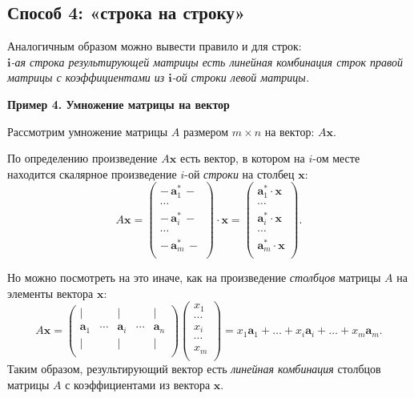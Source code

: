 \documentclass[11pt,a4paper]{article}
\begin{document}
    \hypertarget{ux441ux43fux43eux441ux43eux431-4-ux441ux442ux440ux43eux43aux430-ux43dux430-ux441ux442ux440ux43eux43aux443}{%
\subsection{Способ 4: «строка на
строку»}\label{ux441ux43fux43eux441ux43eux431-4-ux441ux442ux440ux43eux43aux430-ux43dux430-ux441ux442ux440ux43eux43aux443}}

Аналогичным образом можно вывести правило и для строк:\\
\emph{\(\mathbf{i}\)-ая строка результирующей матрицы есть линейная
комбинация строк правой матрицы с коэффициентами из \(\mathbf{i}\)-ой
строки левой матрицы.}

    \textbf{Пример 4. Умножение матрицы на вектор}

Рассмотрим умножение матрицы \(A\) размером \(m \times n\) на вектор:
\(A \mathbf{x}\).

По определению произведение \(A \mathbf{x}\) есть вектор, в котором на
\(i\)-ом месте находится скалярное произведение \(i\)-ой \emph{строки}
на столбец \(\mathbf{x}\): \[
  A \mathbf{x} = 
  \begin{pmatrix}
    -\, \mathbf{a}_1^* \,- \\
    \cdots \\
    -\, \mathbf{a}_i^* \,- \\
    \cdots \\
    -\, \mathbf{a}_m^* \,- \\
  \end{pmatrix}
  \cdot \mathbf{x} = 
  \begin{pmatrix}
    \mathbf{a}_1^* \cdot \mathbf{x} \\
    \cdots \\
    \mathbf{a}_i^* \cdot \mathbf{x} \\
    \cdots \\
    \mathbf{a}_m^* \cdot \mathbf{x} \\
  \end{pmatrix}.
\]

Но можно посмотреть на это иначе, как на произведение \emph{столбцов}
матрицы \(A\) на элементы вектора \(\mathbf{x}\): \[
  A \mathbf{x} = 
  \begin{pmatrix}
     | & {} & | & {} & | \\
     \mathbf{a}_1 & \cdots & \mathbf{a}_i & \cdots & \mathbf{a}_n \\
     | & {} & | & {} & | \\
  \end{pmatrix}
  \begin{pmatrix}
     x_1    \\
     \cdots \\
     x_i    \\
     \cdots \\
     x_m \\
  \end{pmatrix}
  = 
  x_1 \mathbf{a}_1 + \dots + x_i \mathbf{a}_i + \dots + x_m \mathbf{a}_m.
\] Таким образом, результирующий вектор есть \emph{линейная комбинация}
столбцов матрицы \(A\) с коэффициентами из вектора \(\mathbf{x}\).
\end{document}
